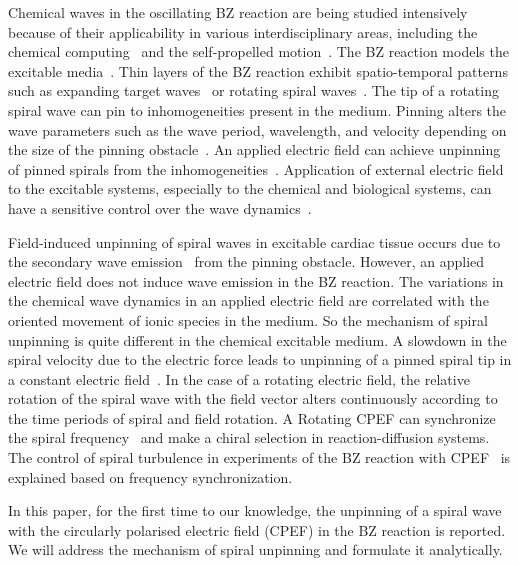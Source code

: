 \documentclass[%
 preprint,
 amsmath,amssymb,
 aps,
]{revtex4-2}
\begin{document}
Chemical waves in the oscillating BZ reaction are being studied intensively because of their applicability in various interdisciplinary areas, including the chemical computing~\cite{gorecki2022information} and the self-propelled motion~\cite{jin2017chemotaxis, ryabchun2022run}. The BZ reaction models the excitable media~\cite{sinha2014patterns}. Thin layers of the BZ reaction exhibit spatio-temporal patterns such as expanding target waves~\cite{zhang2019stability} or rotating spiral waves~\cite{zykov2018spiral}. The tip of a rotating spiral wave can pin to inhomogeneities present in the medium. Pinning alters the wave parameters such as the wave period, wavelength, and velocity depending on the size of the pinning obstacle~\cite{lim2006spiral, sutthiopad2015propagation}. An applied electric field can achieve unpinning of pinned spirals from the inhomogeneities~\cite{jimenez2013electric,punacha2020theory}. 
Application of external electric field to the excitable systems, especially to the chemical and biological systems, can have a sensitive control over the wave dynamics~\cite{steinbock1992electric,bittihn2012negative,feng2022removal}.

Field-induced unpinning of spiral waves in excitable cardiac tissue occurs due to the secondary wave emission~\cite{pumir2007wave} from the pinning obstacle. However, an applied electric field does not induce wave emission in the BZ reaction. The variations in the chemical wave dynamics in an applied electric field are correlated with the oriented movement of ionic species in the medium.
So the mechanism of spiral unpinning is quite different in the chemical excitable medium. A slowdown in the spiral velocity due to the electric force leads to unpinning of a pinned spiral tip in a constant electric field~\cite{dcmechanism}. In the case of a rotating electric field, the relative rotation of the spiral wave with the field vector alters continuously according to the time periods of spiral and field rotation. 
A Rotating CPEF can synchronize the spiral frequency~\cite{chen2009synchronization,li2013chiral} and make a chiral selection in reaction-diffusion systems. The control of spiral turbulence in experiments of the BZ reaction with CPEF~\cite{ji2013experimental} is explained based on frequency synchronization. 
 
In this paper, for the first time to our knowledge, the unpinning of a spiral wave with the circularly polarised electric field (CPEF) in the BZ reaction is reported. We will address the mechanism of spiral unpinning and formulate it analytically.
 
\end{document}

